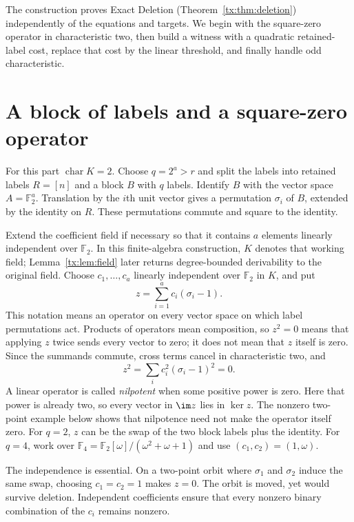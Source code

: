 \documentclass[11pt,a4paper,oneside,openany]{book}
\theoremstyle{definition}\newtheorem{definition}[theorem]{Definition}
\theoremstyle{remark}\newtheorem{remark}[theorem]{Remark}
\newcommand{\Ftwo}{\mathbb F_2}
\numberwithin{equation}{chapter}
\begin{document}
The construction proves Exact Deletion
(Theorem~\ref{tx:thm:deletion}) independently of the equations and targets.
We begin with the square-zero operator in characteristic two,
then build a witness with a quadratic retained-label cost, replace that
cost by the linear threshold, and finally handle odd characteristic.

\section{A block of labels and a square-zero operator}\label{tx:sec:block2}
For this part $\operatorname{char}K=2$. Choose $q=2^a>r$ and split the labels into retained labels $R=[n]$ and a block $B$ with $q$ labels. Identify $B$ with the vector space $A=\Ftwo^a$. Translation by the $i$th unit vector gives a permutation $\sigma_i$ of $B$, extended by the identity on $R$. These permutations commute and square to the identity.

Extend the coefficient field if necessary so that it contains $a$
elements linearly independent over $\Ftwo$. In this finite-algebra
construction, $K$ denotes that working field; Lemma~\ref{tx:lem:field}
later returns degree-bounded derivability to the original field.
Choose $c_1,\ldots,c_a$ linearly independent over $\Ftwo$ in $K$, and put
\begin{equation}\label{tx:eq:z2}z=\sum_{i=1}^ac_i(\sigma_i-1).\end{equation}
This notation means an operator on every vector space on which label permutations act. Products of operators mean composition, so $z^2=0$ means that applying $z$ twice sends every vector to zero; it does not mean that $z$ itself is zero. Since the summands commute, cross terms cancel in characteristic two, and
\[z^2=\sum_i c_i^2(\sigma_i-1)^2=0.\]
A linear operator is called \emph{nilpotent} when some positive
power is zero. Here that power is already two, so every vector
in $\im z$ lies in $\ker z$. The nonzero two-point example below
shows that nilpotence need not make the operator itself zero.
For $q=2$, $z$ can be the swap of the two block labels plus the identity. For $q=4$, work over $\mathbb F_4=\Ftwo[\omega]/(\omega^2+\omega+1)$ and use $(c_1,c_2)=(1,\omega)$.

The independence is essential. On a two-point orbit where $\sigma_1$ and $\sigma_2$ induce the same swap, choosing $c_1=c_2=1$ makes $z=0$. The orbit is moved, yet would survive deletion. Independent coefficients ensure that every nonzero binary combination of the $c_i$ remains nonzero.
\end{document}
